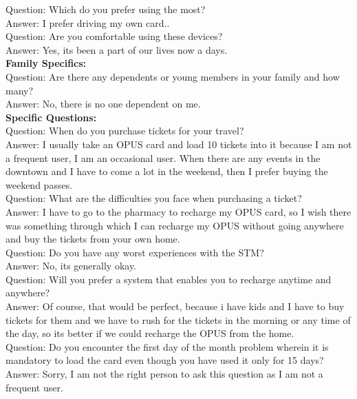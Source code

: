 \documentclass[11pt, english]{report}
\begin{document}
Question: Which do you prefer using the most?\\
Answer: I prefer driving my own card..\\

Question: Are you comfortable using these devices?\\
Answer: Yes, its been a part of our lives now a days.\\

\textbf{Family Specifics:}\\

Question: Are there any dependents or young members in your family and how many?\\
Answer: No, there is no one dependent on me. \\

\textbf{Specific Questions:}\\

Question: When do you purchase tickets for your travel?\\
Answer: I usually take an OPUS card and load 10 tickets into it because I am not a frequent user, I am an occasional user. When there are any events in the downtown and I have to come a lot in the weekend, then I prefer buying the weekend passes.\\

Question: What are the difficulties you face when purchasing a ticket?\\
Answer: I have to go to the pharmacy to recharge my OPUS card, so I wish there was something through which I can recharge my OPUS without going anywhere and buy the tickets from your own home.\\

Question: Do you have any worst experiences with the STM?\\
Answer: No, its generally okay.\\

Question: Will you prefer a system that enables you to recharge anytime and anywhere?\\
Answer: Of course, that would be perfect, because i have kids and I have to buy tickets for them and we have to rush for the tickets in the morning or any time of the day, so its better if we could recharge the OPUS from the home. \\

Question: Do you encounter the first day of the month problem wherein it is mandatory to load the
card even though you have used it only for 15 days?\\
Answer: Sorry, I am not the right person to ask this question as I am not a frequent user.
\end{document}
